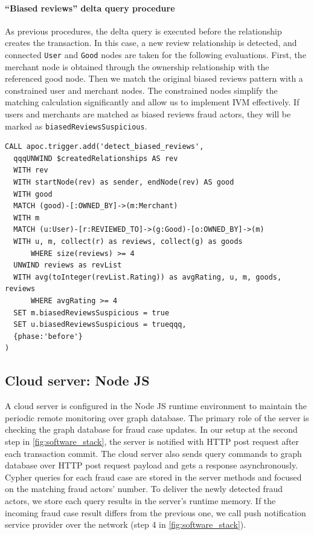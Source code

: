 \paragraph{``Biased reviews'' delta query procedure}

As previous procedures, the delta query is executed before the relationship creates the transaction.
In this case, a new review relationship is detected, and connected \texttt{User} and \texttt{Good} nodes are taken for the following evaluations.
First, the merchant node is obtained through the ownership relationship with the referenced good node.
Then we match the original biased reviews pattern with a constrained user and merchant nodes.
The constrained nodes simplify the matching calculation significantly and allow us to implement IVM effectively.
If users and merchants are matched as biased reviews fraud actors, they will be marked as \texttt{biasedReviewsSuspicious}.

\begin{lstlisting}[language=Cypher,frame=single,caption={Biased reviews delta query procedure},label={lst:biased_reviews_delta_query}]
CALL apoc.trigger.add('detect_biased_reviews',
  qqqUNWIND $createdRelationships AS rev
  WITH rev
  WITH startNode(rev) as sender, endNode(rev) AS good
  WITH good
  MATCH (good)-[:OWNED_BY]->(m:Merchant)
  WITH m
  MATCH (u:User)-[r:REVIEWED_TO]->(g:Good)-[o:OWNED_BY]->(m)
  WITH u, m, collect(r) as reviews, collect(g) as goods
      WHERE size(reviews) >= 4
  UNWIND reviews as revList
  WITH avg(toInteger(revList.Rating)) as avgRating, u, m, goods, reviews
      WHERE avgRating >= 4
  SET m.biasedReviewsSuspicious = true
  SET u.biasedReviewsSuspicious = trueqqq,
  {phase:'before'}
)
\end{lstlisting}

\subsection{Cloud server: Node JS}

A cloud server is configured in the Node JS runtime environment to maintain the periodic remote monitoring over graph database.
The primary role of the server is checking the graph database for fraud case updates.
In our setup at the second step in \autoref{fig:software_stack}, the server is notified with HTTP post request after each transaction commit.
The cloud server also sends query commands to graph database over HTTP post request payload and gets a response asynchronously.
Cypher queries for each fraud case are stored in the server methods and focused on the matching fraud actors' number.
To deliver the newly detected fraud actors, we store each query results in the server's runtime memory.
If the incoming fraud case result differs from the previous one, we call push notification service provider over the network (step 4 in \autoref{fig:software_stack}). 

